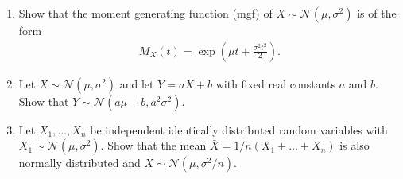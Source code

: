 
\begin{exercise}

\phantom{}

\begin{enumerate}[label = (\alph*)]
  \item Show that the moment generating function (mgf) of $X \sim \mathcal{N}(\mu,\sigma^2)$
  is of the form
  \begin{align*}
    M_X(t) = \exp\left(\mu t +  \frac{\sigma^2 t^2}{2}\right).
  \end{align*}
  \item Let $X \sim \mathcal{N}(\mu,\sigma^2)$ and let $Y = aX + b$ with fixed
  real constants $a$ and $b$. Show that $Y \sim \mathcal{N}(a\mu + b, a^2\sigma^2)$.
  \item Let $X_1,\dots,X_n$ be independent identically distributed random variables
  with $X_1 \sim \mathcal{N}(\mu,\sigma^2)$. Show that the mean $\bar{X} = 1/n(X_1 + \dots + X_n)$
  is also normally distributed and $\bar{X} \sim \mathcal{N}(\mu, \sigma^2/n)$.
\end{enumerate}

\end{exercise}


